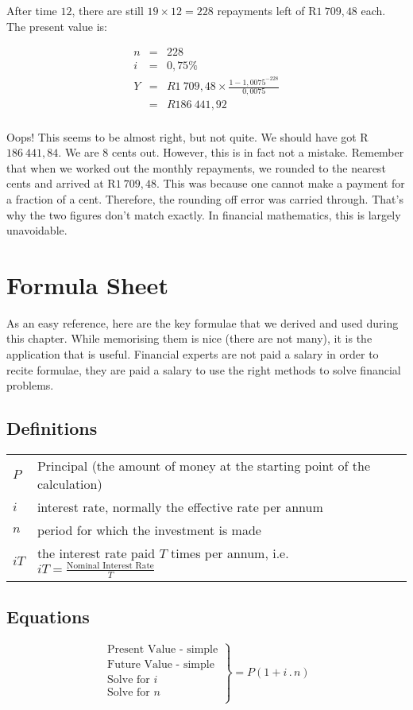 After time $12$, there are still $19 \times 12 = 228$ repayments left of R$1~709,48$ each. The present value is:

\begin{eqnarray*}
n &=& 228\\
i &=& 0,75\%\\
Y &=&R1~709,48 \times \frac{1-1,0075^{-228}}{0,0075}\\
&=& R186~441,92\\
\end{eqnarray*}

Oops! This seems to be almost right, but not quite. We should have got R$186~441,84$. We are $8$ cents out. However, this is in fact not a mistake. Remember that when we worked out the monthly repayments, we rounded to the nearest cents and arrived at R$1~709,48$. This was because one cannot make a payment for a fraction of a cent. Therefore, the rounding off error was carried through. That's why the two figures don't match exactly. In financial mathematics, this is largely unavoidable.


\section{Formula Sheet}
As an easy reference, here are the key formulae that we derived and used during this chapter. While memorising them is nice (there are not many), it is the application that is useful. Financial experts are not paid a salary in order to recite formulae, they are paid a salary to use the right methods to solve financial problems.

\subsection{Definitions}
\begin{tabular}{ll}
$P$ &Principal (the amount of money at the starting point of the calculation)\\
$i$ &interest rate, normally the effective rate per annum\\
$n$ &period for which the investment is made\\
$iT$ &the interest rate paid $T$ times per annum, i.e.\@{} $iT = \frac{\mbox{Nominal Interest Rate}}{T}$
\end{tabular}

\subsection{Equations}
\begin{equation*}
\left.\begin{array}{l}
\mbox{Present Value - simple}\\
\mbox{Future Value - simple} \\
\mbox{Solve for $i$}\\
\mbox{Solve for $n$}\\
\end{array}\right\}= P (1 + i \,.\, n)
\end{equation*}

